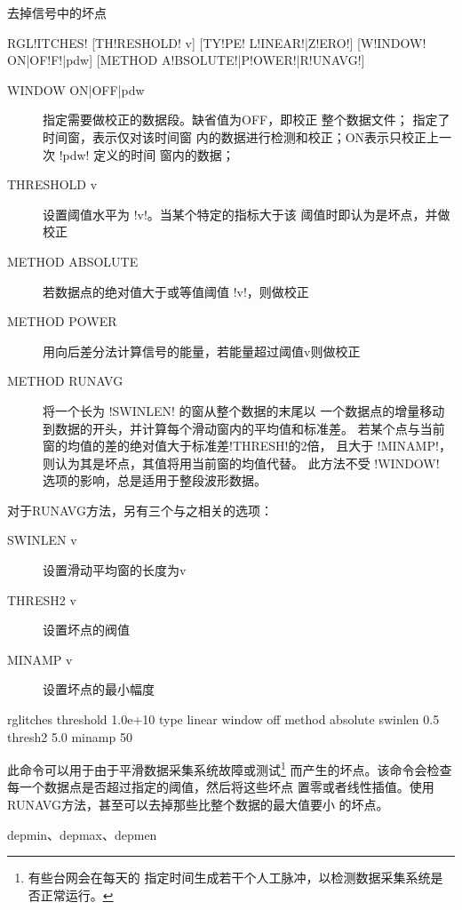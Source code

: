 \label{cmd:rglitches}

去掉信号中的坏点

\begin{SACSTX}
RGL!ITCHES! [TH!RESHOLD! v] [TY!PE! L!INEAR!|Z!ERO!] [W!INDOW! ON|OF!F!|pdw]
    [METHOD A!BSOLUTE!|P!OWER!|R!UNAVG!]
\end{SACSTX}

\begin{description}
\item [WINDOW ON|OFF|pdw] 指定需要做校正的数据段。缺省值为OFF，即校正
    整个数据文件； 指定了时间窗，表示仅对该时间窗
    内的数据进行检测和校正；ON表示只校正上一次 !pdw! 定义的时间
    窗内的数据；
\item [THRESHOLD v] 设置阈值水平为 !v!。当某个特定的指标大于该
    阈值时即认为是坏点，并做校正
\item [METHOD ABSOLUTE] 若数据点的绝对值大于或等值阈值 !v!，则做校正
\item [METHOD POWER] 用向后差分法计算信号的能量，若能量超过阈值v则做校正
\item [METHOD RUNAVG] 将一个长为 !SWINLEN! 的窗从整个数据的末尾以
    一个数据点的增量移动到数据的开头，并计算每个滑动窗内的平均值和标准差。
    若某个点与当前窗的均值的差的绝对值大于标准差!THRESH!的2倍，
    且大于 !MINAMP!，则认为其是坏点，其值将用当前窗的均值代替。
    此方法不受 !WINDOW! 选项的影响，总是适用于整段波形数据。
\end{description}

对于RUNAVG方法，另有三个与之相关的选项：
\begin{description}
\item [SWINLEN v] 设置滑动平均窗的长度为v
\item [THRESH2 v] 设置坏点的阀值
\item [MINAMP v] 设置坏点的最小幅度
\end{description}

\begin{SACDFT}
rglitches threshold 1.0e+10 type linear window off method absolute
    swinlen 0.5 thresh2 5.0 minamp 50
\end{SACDFT}

此命令可以用于由于平滑数据采集系统故障或测试\footnote{有些台网会在每天的
指定时间生成若干个人工脉冲，以检测数据采集系统是否正常运行。}
而产生的坏点。该命令会检查每一个数据点是否超过指定的阈值，然后将这些坏点
置零或者线性插值。使用RUNAVG方法，甚至可以去掉那些比整个数据的最大值要小
的坏点。

depmin、depmax、depmen
